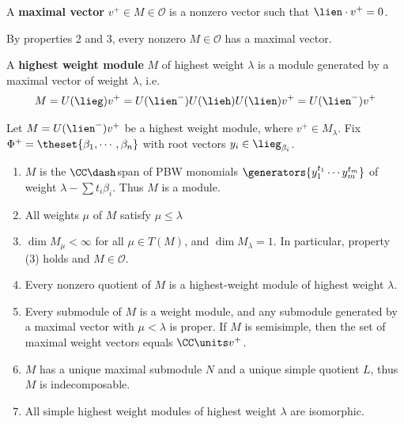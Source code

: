 \begin{definition}

A \textbf{maximal vector} \(v^+ \in M \in \mathcal O\) is a nonzero
vector such that \(\lien \cdot v^+ = 0\).

\end{definition}

\begin{remark}

By properties 2 and 3, every nonzero \(M\in \mathcal O\) has a maximal
vector.

\end{remark}

\begin{definition}

A \textbf{highest weight module} \(M\) of highest weight \(\lambda\) is
a module generated by a maximal vector of weight \(\lambda\), i.e.~
\begin{align*}M = U(\lieg) v^+ = U(\lien^-) U(\lieh) U(\lien) v^+ = U(\lien^-) v^+\end{align*}

\end{definition}

\begin{theorem}

Let \(M = U(\lien^-)v^+\) be a highest weight module, where
\(v^+ \in M_\lambda\). Fix
\(\Phi^+ = \theset{\beta_1, \cdots, \beta_n}\) with root vectors
\(y_i \in \lieg_{\beta_i}\).

\begin{enumerate}
\def\labelenumi{\alph{enumi}.}
\item
  \(M\) is the \(\CC\dash\)span of PBW monomials
  \(\generators{ y_1^{t_1} \cdots y_m^{t_m}}\) of weight
  \(\lambda - \sum t_i \beta_i\). Thus \(M\) is a module.
\item
  All weights \(\mu\) of \(M\) satisfy \(\mu \leq \lambda\)
\item
  \(\dim M_\mu < \infty\) for all \(\mu \in T(M)\), and
  \(\dim M_\lambda = 1\). In particular, property (3) holds and
  \(M \in \mathcal O\).
\item
  Every nonzero quotient of \(M\) is a highest-weight module of highest
  weight \(\lambda\).
\item
  Every submodule of \(M\) is a weight module, and any submodule
  generated by a maximal vector with \(\mu < \lambda\) is proper. If
  \(M\) is semisimple, then the set of maximal weight vectors equals
  \(\CC\units v^+\).
\item
  \(M\) has a unique maximal submodule \(N\) and a unique simple
  quotient \(L\), thus \(M\) is indecomposable.
\item
  All simple highest weight modules of highest weight \(\lambda\) are
  isomorphic.
\end{enumerate}

\end{theorem}

